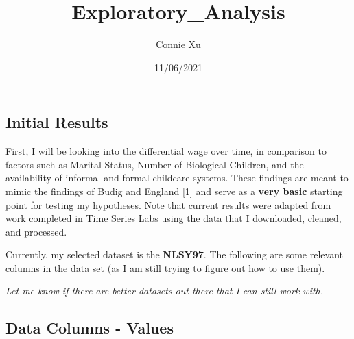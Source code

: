 \documentclass[
]{article}
\title{Exploratory\_Analysis}
\author{Connie Xu}
\date{11/06/2021}
\begin{document}
\maketitle

\hypertarget{initial-results}{%
\subsection{Initial Results}\label{initial-results}}

First, I will be looking into the differential wage over time, in
comparison to factors such as Marital Status, Number of Biological
Children, and the availability of informal and formal childcare systems.
These findings are meant to mimic the findings of Budig and England
{[}1{]} and serve as a \textbf{very basic} starting point for testing my
hypotheses. Note that current results were adapted from work completed
in Time Series Labs using the data that I downloaded, cleaned, and
processed.

Currently, my selected dataset is the \textbf{NLSY97}. The following are
some relevant columns in the data set (as I am still trying to figure
out how to use them).

\emph{Let me know if there are better datasets out there that I can
still work with.}

\hypertarget{data-columns---values}{%
\subsection{Data Columns - Values}\label{data-columns---values}}
\end{document}
